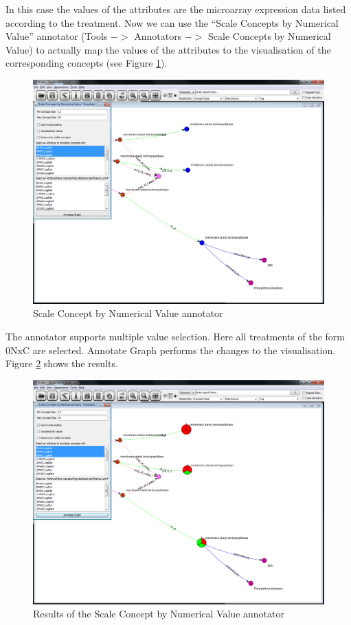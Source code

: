 In this case the values of the attributes are the microarray expression data listed according to the treatment. 
Now we can use the ``Scale Concepts by Numerical Value'' annotator (Tools $->$ Annotators $->$ Scale Concepts by Numerical Value) 
to actually map the values of the attributes to the visualisation of the corresponding concepts (see Figure \ref{fig:scale}).

\begin{figure}[H]
\centering
\includegraphics[scale=0.35]{images/Oct12/app1fig9.png} 
\caption{Scale Concept by Numerical Value annotator}
\label{fig:scale}
\end{figure}

The annotator supports multiple value selection. 
Here all treatments of the form 0NxC are selected. 
Annotate Graph performs the changes to the visualisation.
Figure \ref{fig:scale_results} shows the results.

\begin{figure}[H]
\centering
\includegraphics[scale=0.35]{images/Oct12/app1fig10.png} 
\caption{Results of the Scale Concept by Numerical Value annotator}
\label{fig:scale_results}
\end{figure}

